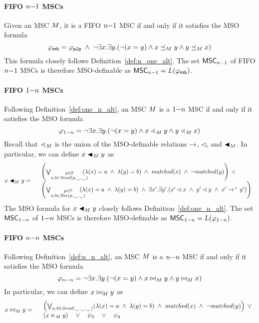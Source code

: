 \paragraph*{FIFO $n\mathsf{-}1$ MSCs}

Given an MSC $M$, it is a FIFO $n\mathsf{-}1$ MSC if and only if it satisfies the MSO formula
\[
	\varphi_{\mathsf{mb}} = \varphi_{\mathsf{p2p}} \;\wedge\; \neg \exists x.\exists y.(\neg (x = y) \wedge x \preceq_M y \wedge y \preceq_M x)
\]
This formula closely follows Definition~\ref{def:n_one_alt}. The set $\mathsf{MSC}_{n\mathsf{-}1}$ of FIFO $n\mathsf{-}1$ MSCs is therefore MSO-definable as $\mathsf{MSC}_{n\mathsf{-}1}=L(\varphi_{\mathsf{mb}})$.

\paragraph*{FIFO $1\mathsf{-}n$ MSCs}

Following Definition~\ref{def:one_n_alt}, an MSC $M$ is a $1\mathsf{-}n$ MSC if and only if it satisfies the MSO formula
\[
	\varphi_{1\mathsf{-}n} = \neg \exists x.\exists y.(\neg (x = y) \wedge x \lessdot_M y \wedge y \lessdot_M x)
\]
Recall that $\lessdot_M$ is the union of the MSO-definable relations $\to$, $\lhd$, and $\blacktriangleleft_M$. In particular, we can define $x \blacktriangleleft_M y$ as 
\[
x \blacktriangleleft_M y =
\begin{array}{rl}
& \left(
	\bigvee_{\substack{p \in \mathbb{P}\\a,b \in {\mathit{Send}(p,\hspace{0.1em}\underline{\hspace{0.5em}}\hspace{0.1em},\hspace{0.1em}\underline{\hspace{0.5em}}\hspace{0.1em})}}}\hspace{-1em}
	(\lambda(x) = a \;\wedge\; \lambda(y) = b)
	\;\wedge\; \mathit{matched}(x) \;\wedge\; \neg \mathit{matched}(y)
\right) \;\vee\\
& \left(
	\bigvee_{\substack{p \in \mathbb{P}\\a,b \in {\mathit{Rec}(p,\hspace{0.1em}\underline{\hspace{0.5em}}\hspace{0.1em},\hspace{0.1em}\underline{\hspace{0.5em}}\hspace{0.1em})}}}\hspace{-1em}
	(\lambda(x) = a \;\wedge\; \lambda(y) = b)
	\;\wedge\; 
	\exists x'.\exists y'. (x' \lhd x \;\wedge\; y' \lhd y \;\wedge\; x' \to^+ y')
\right)\\
\end{array}
\]
The MSO formula for $x \blacktriangleleft_M y$ closely follows Definition~\ref{def:one_n_alt}. The set $\mathsf{MSC}_{1\mathsf{-}n}$ of $1\mathsf{-}n$ MSCs is therefore MSO-definable as $\mathsf{MSC}_{1\mathsf{-}n}=L(\varphi_{1\mathsf{-}n})$.

\paragraph*{FIFO $n\mathsf{-}n$ MSCs}

Following Definition~\ref{def:n_n_alt}, an MSC $M$ is a $n\mathsf{-}n$ MSC if and only if it satisfies the MSO formula
\[
	\varphi_{n\mathsf{-}n} = \neg \exists x.\exists y.(\neg (x = y) \wedge x \bowtie_M y \wedge y \bowtie_M x)
\]
In particular, we can define $x \bowtie_M y$ as
\[
	x \bowtie_M y =
	\begin{array}{rl}
	& \left(
		\bigvee_{\substack{a,b \in {\mathit{Send}(\hspace{0.1em}\underline{\hspace{0.5em}}\hspace{0.1em},\hspace{0.1em}\underline{\hspace{0.5em}}\hspace{0.1em},\hspace{0.1em}\underline{\hspace{0.5em}}\hspace{0.1em})}}}
		(\lambda(x) = a \;\wedge\; \lambda(y) = b)
		\;\wedge\; \mathit{matched}(x) \;\wedge\; \neg \mathit{matched}(y)
	\right) \;\vee\\
	& (x \ltimes_M y) \quad \vee \quad \psi_3 \quad \vee \quad \psi_4\\
	\end{array}
\]

